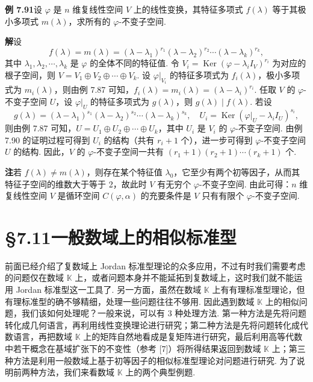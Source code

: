 \documentclass[UTF8, 12pt, fontset=fandol, oneside]{ctexart}
\begin{document}
\noindent\textbf{例 7.91}\quad 设 $\varphi$ 是 $n$ 维复线性空间 $V$ 上的线性变换，其特征多项式 $f(\lambda)$ 等于其极小多项式 $m(\lambda)$，求所有的 $\varphi$-不变子空间.

\noindent\textbf{解}\quad 设
\[
f(\lambda)=m(\lambda)=(\lambda-\lambda_1)^{r_1}(\lambda-\lambda_2)^{r_2}\cdots(\lambda-\lambda_k)^{r_k},
\]
其中 $\lambda_1,\lambda_2,\cdots,\lambda_k$ 是 $\varphi$ 的全体不同的特征值. 令 $V_i=\operatorname{Ker}(\varphi-\lambda_iI_V)^{r_i}$ 为对应的根子空间，则 $V=V_1\oplus V_2\oplus\cdots\oplus V_k$. 设 $\varphi|_{V_i}$ 的特征多项式为 $f_i(\lambda)$，极小多项式为 $m_i(\lambda)$，则由例 7.87 可知，$f_i(\lambda)=m_i(\lambda)=(\lambda-\lambda_i)^{r_i}$. 任取 $V$ 的 $\varphi$-不变子空间 $U$，设 $\varphi|_U$ 的特征多项式为 $g(\lambda)$，则 $g(\lambda)\mid f(\lambda)$. 若设
\[
g(\lambda)=(\lambda-\lambda_1)^{s_1}(\lambda-\lambda_2)^{s_2}\cdots(\lambda-\lambda_k)^{s_k},\quad U_i=\operatorname{Ker}(\varphi|_U-\lambda_iI_U)^{s_i},
\]
则由例 7.87 可知，$U=U_1\oplus U_2\oplus\cdots\oplus U_k$，其中 $U_i$ 是 $V_i$ 的 $\varphi$-不变子空间. 由例 7.90 的证明过程可得到 $U_i$ 的结构（共有 $r_i+1$ 个），进一步可得到 $\varphi$-不变子空间 $U$ 的结构. 因此，$V$ 的 $\varphi$-不变子空间一共有 $(r_1+1)(r_2+1)\cdots(r_k+1)$ 个.

\noindent\textbf{注}\quad 若 $f(\lambda)\ne m(\lambda)$，则存在某个特征值 $\lambda_0$，它至少有两个初等因子，从而其特征子空间的维数大于等于 2，故此时 $V$ 有无穷个 $\varphi$-不变子空间. 由此可得：$n$ 维复线性空间 $V$ 是循环空间 $C(\varphi,\alpha)$ 的充要条件是 $V$ 只有有限个 $\varphi$-不变子空间.

\section*{§7.11\quad 一般数域上的相似标准型}

前面已经介绍了复数域上 Jordan 标准型理论的众多应用，不过有时我们需要考虑的问题仅在数域 $\mathbb{K}$ 上，或者问题本身并不能延拓到复数域上，这时我们就不能运用 Jordan 标准型这一工具了. 另一方面，虽然在数域 $\mathbb{K}$ 上有有理标准型理论，但有理标准型的确不够精细，处理一些问题往往不够用. 因此遇到数域 $\mathbb{K}$ 上的相似问题，我们该如何处理呢？一般来说，可以有 3 种处理方法. 第一种方法是先将问题转化成几何语言，再利用线性变换理论进行研究；第二种方法是先将问题转化成代数语言，再把数域 $\mathbb{K}$ 上的矩阵自然地看成是复矩阵进行研究，最后利用高等代数中若干概念在基域扩张下的不变性（参考 [7]）将所得结果返回到数域 $\mathbb{K}$ 上；第三种方法是利用一般数域上基于初等因子的相似标准型理论对问题进行研究. 为了说明前两种方法，我们来看数域 $\mathbb{K}$ 上的两个典型例题.
\end{document}
